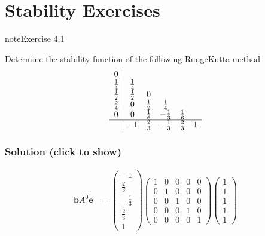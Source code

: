 \documentclass[letterpaper,10pt,english]{jupyterBook}
\begin{document}
\section{Stability Exercises}
\label{\detokenize{4_Stability/4.5_Stability_exercises:stability-exercises}}\label{\detokenize{4_Stability/4.5_Stability_exercises::doc}}
\begin{sphinxadmonition}{note}{Exercise 4.1}

\sphinxAtStartPar
Determine the stability function of the following Runge\sphinxhyphen{}Kutta method
\begin{align*}
    \begin{array}{c|ccccc}
        0 &  &  &  &  & \\
        \frac{1}{4} & \frac{1}{4} &  &  &  & \\
        \frac{1}{2} & \frac{1}{2} & 0 &  &  & \\
        \frac{3}{4} & 0 & \frac{1}{2} & \frac{1}{4} &  &    \\
        0 & 0 & \frac{1}{6} & -\frac{1}{3} & \frac{1}{6} & \\ \hline
        & -1 & \frac{2}{3} & -\frac{1}{3} & \frac{2}{3} & 1
    \end{array}
\end{align*}\subsubsection*{Solution (click to show)}
\begin{align*}
    \mathbf{b} A^0 \mathbf{e} &= 
    \begin{pmatrix} -1 \\ \frac{2}{3} \\ -\frac{1}{3} \\ \frac{2}{3} \\ 1 \end{pmatrix}
    \begin{pmatrix} 
        1 & 0 & 0 & 0 & 0 \\
        0 & 1 & 0 & 0 & 0 \\
        0 & 0 & 1 & 0 & 0 \\
        0 & 0 & 0 & 1 & 0 \\
        0 & 0 & 0 & 0 & 1 
    \end{pmatrix}
    \begin{pmatrix} 1 \\ 1 \\ 1 \\ 1 \\ 1 \end{pmatrix}

\end{align*}
\end{sphinxadmonition}
\end{document}
